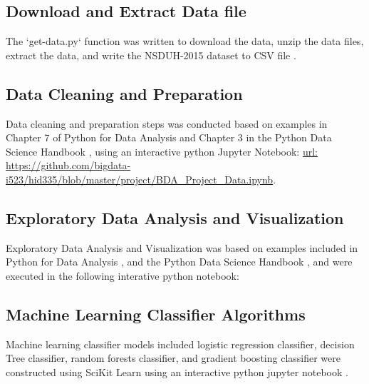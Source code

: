 \documentclass[sigconf]{acmart}
\begin{document}
\subsection{Download and Extract Data file \cite{getdata17}}

The `get-data.py` function was written to download the data, unzip the data
files, extract the data, and write the NSDUH-2015 dataset to CSV file 
\cite{getdata17}.

\subsection{Data Cleaning and Preparation \cite{mckinney17}}

Data cleaning and preparation steps was conducted based on examples in 
Chapter 7 of Python for Data Analysis \cite{mckinney17} and Chapter 3 in 
the Python Data Science Handbook \cite{vanderplas17}, using an interactive 
python Jupyter Notebook: \url{url: https://github.com/bigdata-i523/hid335/blob/master/project/BDA_Project_Data.ipynb}.

\subsection{Exploratory Data Analysis and Visualization\cite{vanderplas17}}

Exploratory Data Analysis and Visualization was based on examples included
in Python for Data Analysis \cite{mckinney17}, and the Python Data Science 
Handbook \cite{vanderplas17}, and were executed in the following interative
python notebook: 


\subsection{Machine Learning Classifier Algorithms}
Machine learning classifier models included logistic regression classifier, 
decision Tree classifier, random forests classifier, and gradient boosting 
classifier were constructed using SciKit Learn \cite{muller17, raschka17} 
using an interactive python jupyter notebook \cite{classifyH}. 





%
\end{document}
